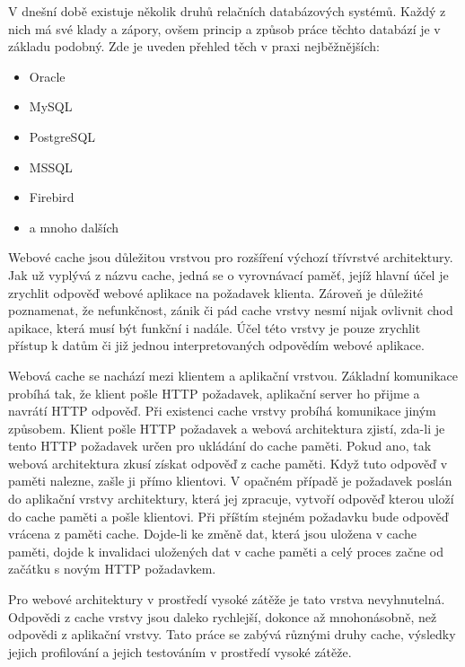 \documentclass[12pt]{article}
\begin{document}
V dnešní době existuje několik druhů relačních databázových systémů. Každý z nich má své klady a zápory, ovšem princip a způsob práce těchto databází je v základu podobný. Zde je uveden přehled těch v praxi nejběžnějších:

\begin{itemize}
\item Oracle
\item MySQL
\item PostgreSQL
\item MSSQL
\item Firebird
\item a mnoho dalších
\end{itemize}



Webové cache jsou důležitou vrstvou pro rozšíření výchozí třívrstvé architektury. Jak už vyplývá z názvu cache, jedná se o vyrovnávací paměť, jejíž hlavní účel je zrychlit odpověď webové aplikace na požadavek klienta. Zároveň je důležité poznamenat, že nefunkčnost, zánik či pád cache vrstvy nesmí nijak ovlivnit chod apikace, která musí být funkční i nadále. Účel této vrstvy je pouze zrychlit přístup k datům či již jednou interpretovaných odpovědím webové aplikace.

Webová cache se nachází mezi klientem a aplikační vrstvou. Základní komunikace probíhá tak, že klient pošle HTTP požadavek, aplikační server ho přijme a navrátí HTTP odpověď. Při existenci cache vrstvy probíhá komunikace jiným způsobem. Klient pošle HTTP požadavek a webová architektura zjistí, zda-li je tento HTTP požadavek určen pro ukládání do cache paměti. Pokud ano, tak webová architektura zkusí získat odpověď z cache paměti. Když tuto odpověď v paměti nalezne, zašle ji přímo klientovi. V opačném případě je požadavek poslán do aplikační vrstvy architektury, která jej zpracuje, vytvoří odpověď kterou uloží do cache paměti a pošle klientovi. Při příštím stejném požadavku bude odpověď vrácena z paměti cache. Dojde-li ke změně dat, která jsou uložena v cache paměti, dojde k invalidaci uložených dat v cache paměti a celý proces začne od začátku s novým HTTP požadavkem.

Pro webové architektury v prostředí vysoké zátěže je tato vrstva nevyhnutelná. Odpovědi z cache vrstvy jsou daleko rychlejší, dokonce až mnohonásobně, než odpovědi z aplikační vrstvy. Tato práce se zabývá různými druhy cache, výsledky jejich profilování a jejich testováním v prostředí vysoké zátěže.
\end{document}
